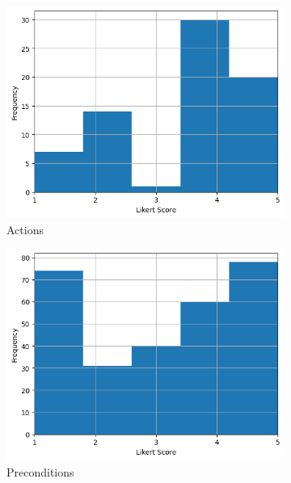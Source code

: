 \documentclass[phd,electronic,oneside,twosidetoc,letterpaper,chaptercenter,parttop,lof]{byumsphd}
\begin{document}
\begin{figure}[t!]
  \centering
  \begin{subfigure}[b]{0.32\textwidth}
    \includegraphics[width=\textwidth]{images/llmexica/story_action_likert_scores.png}
    \caption{Actions}
    \label{fig:actions}
  \end{subfigure}
  \begin{subfigure}[b]{0.32\textwidth}
    \includegraphics[width=\textwidth]{images/llmexica/story_precondition_likert_scores.png}
    \caption{Preconditions}
    \label{fig:preconditions}
  \end{subfigure}
  \begin{subfigure}[b]{0.32\textwidth}

\end{subfigure}
\end{figure}
\end{document}
